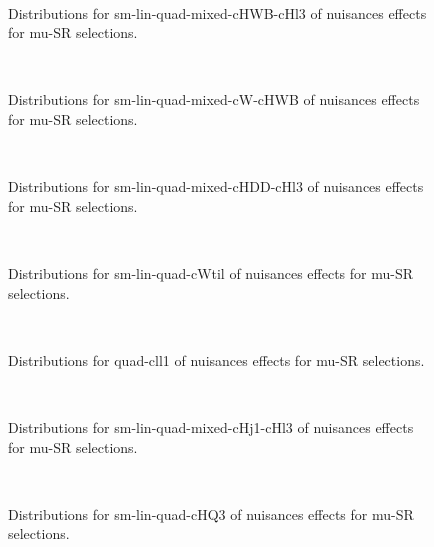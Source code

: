 \begin{figure}[htbp]  
\centering 
\\ 
\caption{ 
   Distributions for sm-lin-quad-mixed-cHWB-cHl3 of nuisances effects for mu-SR selections.
} 
\label{fig:sm_lin_quad_mixed_cHWB_cHl3_mu_SR} 
\end{figure} 




\begin{figure}[htbp]  
\centering 
\\ 
\caption{ 
   Distributions for sm-lin-quad-mixed-cW-cHWB of nuisances effects for mu-SR selections.
} 
\label{fig:sm_lin_quad_mixed_cW_cHWB_mu_SR} 
\end{figure} 




\begin{figure}[htbp]  
\centering 
\\ 
\caption{ 
   Distributions for sm-lin-quad-mixed-cHDD-cHl3 of nuisances effects for mu-SR selections.
} 
\label{fig:sm_lin_quad_mixed_cHDD_cHl3_mu_SR} 
\end{figure} 




\begin{figure}[htbp]  
\centering 
\\ 
\caption{ 
   Distributions for sm-lin-quad-cWtil of nuisances effects for mu-SR selections.
} 
\label{fig:sm_lin_quad_cWtil_mu_SR} 
\end{figure} 




\begin{figure}[htbp]  
\centering 
\\ 
\caption{ 
   Distributions for quad-cll1 of nuisances effects for mu-SR selections.
} 
\label{fig:quad_cll1_mu_SR} 
\end{figure} 




\begin{figure}[htbp]  
\centering 
\\ 
\caption{ 
   Distributions for sm-lin-quad-mixed-cHj1-cHl3 of nuisances effects for mu-SR selections.
} 
\label{fig:sm_lin_quad_mixed_cHj1_cHl3_mu_SR} 
\end{figure} 




\begin{figure}[htbp]  
\centering 
\\ 
\caption{ 
   Distributions for sm-lin-quad-cHQ3 of nuisances effects for mu-SR selections.
} 
\label{fig:sm_lin_quad_cHQ3_mu_SR} 
\end{figure} 




